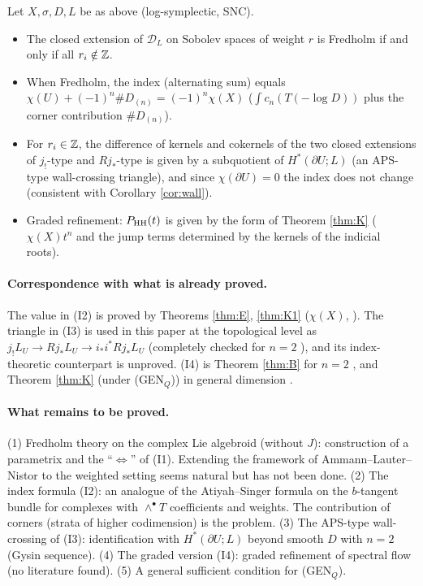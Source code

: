 \begin{conj}\tK\label{conj:index}
Let $X,\sigma,D,L$ be as above (log-symplectic, SNC).
\begin{itemize}
\item[(I1)] The closed extension of $\mathcal D_L$ on Sobolev spaces of weight $r$ is Fredholm if and only if all $r_i\notin\mathbb Z$.
\item[(I2)] When Fredholm, the index (alternating sum) equals $\chi(U)+(-1)^n\#D_{(n)}=(-1)^n\chi(X)$ ($\int c_n(T(-\log D))$ plus the corner contribution $\#D_{(n)}$).
\item[(I3)] For $r_i\in\mathbb Z$, the difference of kernels and cokernels of the two closed extensions of $j_!$-type and $Rj_*$-type is given by a subquotient of $H^*(\partial U;L)$ (an APS-type wall-crossing triangle), and since $\chi(\partial U)=0$ the index does not change (consistent with Corollary \ref{cor:wall}).
\item[(I4)] Graded refinement: $P_{\mathrm{HH}}(t)$ is given by the form of Theorem \ref{thm:K} ($\chi(X)t^n$ and the jump terms determined by the kernels of the indicial roots).
\end{itemize}
\end{conj}
\paragraph{Correspondence with what is already proved.} The value in (I2) is proved by Theorems \ref{thm:E}, \ref{thm:K1} ($\chi(X)$, \tP). The triangle in (I3) is used in this paper at the topological level as $j_!L_U\to Rj_*L_U\to i_*i^*Rj_*L_U$ (completely checked for $n=2$ \tP \tV), and its index-theoretic counterpart is unproved. (I4) is Theorem \ref{thm:B} for $n=2$ \tP, and Theorem \ref{thm:K} (under (GEN$_Q$)) in general dimension \tP.
\paragraph{What remains to be proved.} (1) Fredholm theory on the complex Lie algebroid (without $J$): construction of a parametrix and the ``$\Leftrightarrow$'' of (I1). Extending the framework of Ammann--Lauter--Nistor to the weighted setting seems natural but has not been done. (2) The index formula (I2): an analogue of the Atiyah--Singer formula on the $b$-tangent bundle \cite{BLS} for complexes with $\wedge^\bullet T$ coefficients and weights. The contribution of corners (strata of higher codimension) is the problem. (3) The APS-type wall-crossing of (I3): identification with $H^*(\partial U;L)$ beyond smooth $D$ with $n=2$ (Gysin sequence). (4) The graded version (I4): graded refinement of spectral flow (no literature found). (5) A general sufficient condition for (GEN$_Q$).

